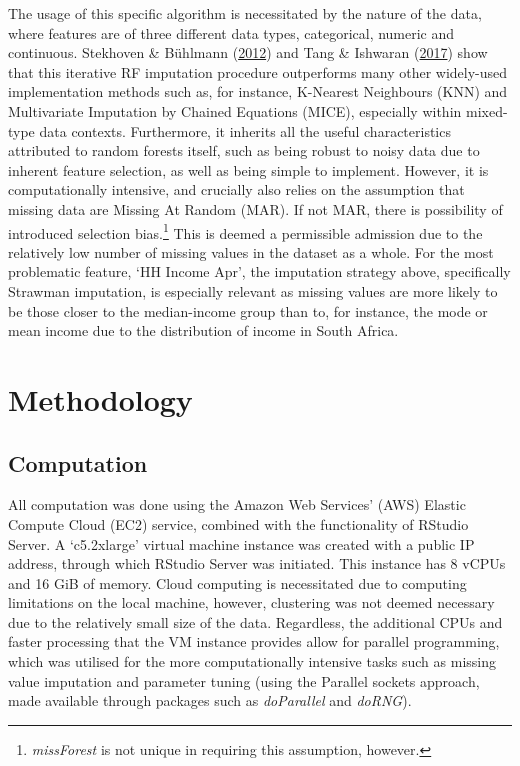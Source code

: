 \documentclass[11pt,preprint, authoryear]{elsarticle}
\numberwithin{equation}{section}
\numberwithin{figure}{section}
\numberwithin{table}{section}
\let\rmarkdownfootnote\footnote%
\def\footnote{\protect\rmarkdownfootnote}
\begin{document}
The usage of this specific algorithm is necessitated by the nature of
the data, where features are of three different data types, categorical,
numeric and continuous. Stekhoven \& Bühlmann
(\protect\hyperlink{ref-stekhoven2012missforest}{2012}) and Tang \&
Ishwaran (\protect\hyperlink{ref-tang2017random}{2017}) show that this
iterative RF imputation procedure outperforms many other widely-used
implementation methods such as, for instance, K-Nearest Neighbours (KNN)
and Multivariate Imputation by Chained Equations (MICE), especially
within mixed-type data contexts. Furthermore, it inherits all the useful
characteristics attributed to random forests itself, such as being
robust to noisy data due to inherent feature selection, as well as being
simple to implement. However, it is computationally intensive, and
crucially also relies on the assumption that missing data are Missing At
Random (MAR). If not MAR, there is possibility of introduced selection
bias.\footnote{\emph{missForest} is not unique in requiring this
  assumption, however.} This is deemed a permissible admission due to
the relatively low number of missing values in the dataset as a whole.
For the most problematic feature, `HH Income Apr', the imputation
strategy above, specifically Strawman imputation, is especially relevant
as missing values are more likely to be those closer to the
median-income group than to, for instance, the mode or mean income due
to the distribution of income in South Africa.

\hypertarget{methodology}{%
\section{\texorpdfstring{Methodology
\label{Meth}}{Methodology }}\label{methodology}}

\hypertarget{computation}{%
\subsection*{Computation}\label{computation}}

All computation was done using the Amazon Web Services' (AWS) Elastic
Compute Cloud (EC2) service, combined with the functionality of RStudio
Server. A `c5.2xlarge' virtual machine instance was created with a
public IP address, through which RStudio Server was initiated. This
instance has 8 vCPUs and 16 GiB of memory. Cloud computing is
necessitated due to computing limitations on the local machine, however,
clustering was not deemed necessary due to the relatively small size of
the data. Regardless, the additional CPUs and faster processing that the
VM instance provides allow for parallel programming, which was utilised
for the more computationally intensive tasks such as missing value
imputation and parameter tuning (using the Parallel sockets approach,
made available through packages such as \emph{doParallel} and
\emph{doRNG}).
\end{document}
